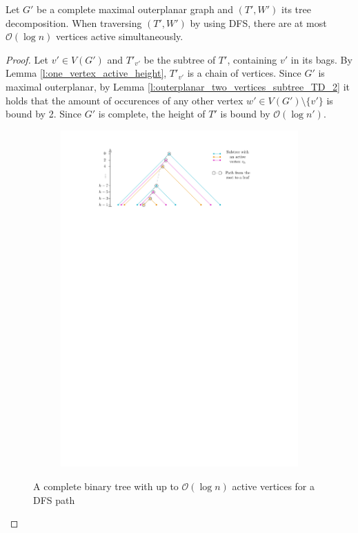 \begin{lemma}\label{l:complete_maximal_outerplanar_log_n_active}
	Let $G'$ be a complete maximal outerplanar graph and $(T',W')$ its tree decomposition. When traversing $(T',W')$ by using DFS, there are at most $\mathcal{O}(\log n)$ vertices active simultaneously.
\end{lemma}
\begin{proof}
	Let $v' \in V(G')$ and $T'_{v'}$ be the subtree of $T'$, containing $v'$ in its bags. By Lemma \ref{l:one_vertex_active_height}, $T'_{v'}$ is a chain of vertices. Since $G'$ is maximal outerplanar, by Lemma \ref{l:outerplanar_two_vertices_subtree_TD_2} it holds that the amount of occurences of any other vertex $w'\in V(G')\setminus\{v'\}$ is bound by 2. Since $G'$ is complete, the height of $T'$ is bound by $\mathcal{O}(\log n')$.
		\begin{figure}[H]
		\centering
		\begin{subfigure}{\textwidth}
			\centering
			\includegraphics[page=1,width=0.9\linewidth]{graphics/active_vertices_log_n.pdf}
		\end{subfigure}
		\caption{A complete binary tree with up to $\mathcal{O}(\log n)$ active vertices for a DFS path}\label{im:active_vertices_log_n}
	\end{figure}


\end{proof}
